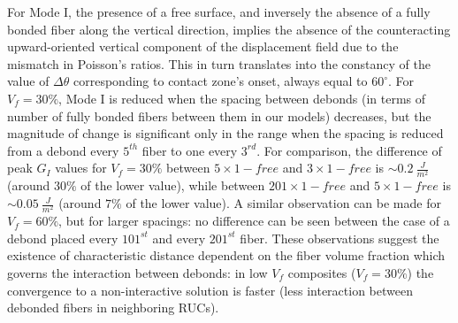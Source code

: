For Mode I, the presence of a free surface, and inversely the absence of a fully bonded fiber along the vertical direction, implies the absence of the counteracting upward-oriented vertical component of the displacement field due to the mismatch in Poisson's ratios. This in turn translates into the constancy of the value of $\Delta\theta$ corresponding to contact zone's onset, always equal to $60^{\circ}$. For $V_{f}=30\%$, Mode I is reduced when the spacing between debonds (in terms of number of fully bonded fibers between them in our models) decreases, but the magnitude of change is significant only in the range when the spacing is reduced from a debond every $5^{th}$ fiber to one every $3^{rd}$. For comparison, the difference of peak $G_{I}$ values for $V_{f}=30\%$ between $5\times 1-free$ and $3\times 1-free$ is $\sim 0.2\ \frac{J}{m^{2}}$ (around $30\%$ of the lower value), while between $201\times 1-free$ and $5\times 1-free$ is $\sim 0.05\ \frac{J}{m^{2}}$ (around $7\%$ of the lower value). A similar observation can be made for $V_{f}=60\%$, but for larger spacings: no difference can be seen between the case of a debond placed every $101^{st}$ and every $201^{st}$ fiber. These observations suggest the existence of characteristic distance dependent on the fiber volume fraction which governs the interaction between debonds: in low $V_{f}$ composites ($V_{f}=30\%$) the convergence to a non-interactive solution is faster (less interaction between debonded fibers in neighboring RUCs).

